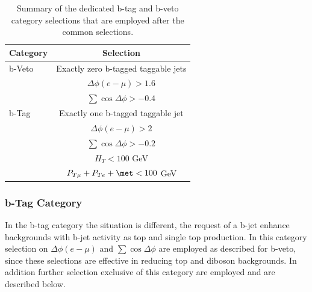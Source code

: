 \begin{table}[t]
  \begin{center}
    \begin{tabular}{p{4cm}c}
      \hline \hline
      Category & Selection \\ [3pt]
      \hline
      b-Veto & Exactly zero b-tagged taggable jets \\	
      & $\Delta\phi(e-\mu)>1.6$ \\
      & $\sum\cos\Delta\phi > -0.4$ \\[5pt]
      \hline
      b-Tag & Exactly one b-tagged taggable jet \\
      & $\Delta\phi(e-\mu)>2$ \\
      & $\sum\cos\Delta\phi > -0.2$ \\
      & $ H_T < 100$ GeV \\
      & $P_{T\mu} + P_{Te} + \met < 100$ GeV \\[3pt]
      \hline \hline
    \end{tabular}
    \caption{Summary of the dedicated b-tag and b-veto category selections that are employed after the common selections.}
    \label{tab:sel}
  \end{center}
\end{table}

\subsubsection{b-Tag Category}\label{sec:tag}
In the b-tag category the situation is different, 
the  request of a b-jet enhance backgrounds with b-jet activity as top and single top production.
In this category selection on $\Delta\phi(e-\mu)$ and $\sum\cos\Delta\phi$  are employed as described for b-veto,
since these selections are effective in reducing top and diboson backgrounds. In addition further selection exclusive of this category
are employed  and are described below.


